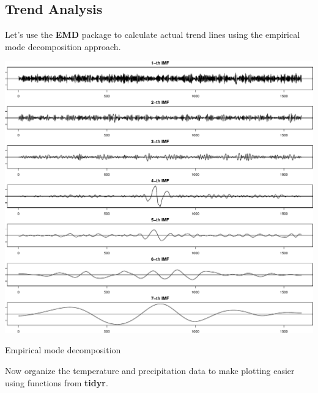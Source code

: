 \documentclass[11pt,]{tufte-handout}
\begin{document}
\subsection{Trend Analysis}\label{trend-analysis}

Let's use the \textbf{EMD} package to calculate actual trend lines using
the empirical mode decomposition approach.

\begin{marginfigure}
\includegraphics{climate-analysis_files/figure-latex/unnamed-chunk-2-1} \caption[Empirical mode decomposition]{Empirical mode decomposition}\label{fig:unnamed-chunk-2}
\end{marginfigure}

Now organize the temperature and precipitation data to make plotting
easier using functions from \textbf{tidyr}.
\end{document}
